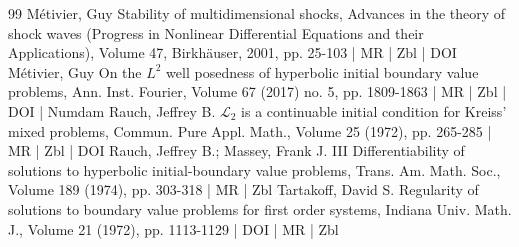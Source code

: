 \documentclass[10pt]{amsart}
\theoremstyle{definition}\newtheorem{defi}[theo]{Definition}\newtheorem{rema}[theo]{Remark}\newtheorem{exam}[theo]{Example}\newtheorem{exem}[theo]{Example}\newtheorem{nota}[theo]{Notation}
\begin{document}
\begin{thebibliography}{99}
Métivier, Guy Stability of multidimensional shocks, Advances in the theory of shock waves (Progress in Nonlinear Differential Equations and their Applications), Volume 47, Birkhäuser, 2001, pp. 25-103 | MR | Zbl | DOI
Métivier, Guy On the ${L}^2$ well posedness of hyperbolic initial boundary value problems, Ann. Inst. Fourier, Volume 67 (2017) no. 5, pp. 1809-1863 | MR | Zbl | DOI | Numdam
Rauch, Jeffrey B. ${\mathcal{L}}_{2}$ is a continuable initial condition for Kreiss’ mixed problems, Commun. Pure Appl. Math., Volume 25 (1972), pp. 265-285 | MR | Zbl | DOI
Rauch, Jeffrey B.; Massey, Frank J. III Differentiability of solutions to hyperbolic initial-boundary value problems, Trans. Am. Math. Soc., Volume 189 (1974), pp. 303-318 | MR | Zbl
Tartakoff, David S. Regularity of solutions to boundary value problems for first order systems, Indiana Univ. Math. J., Volume 21 (1972), pp. 1113-1129 | DOI | MR | Zbl
\end{thebibliography}
\end{document}
